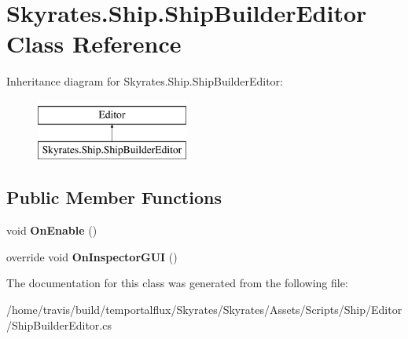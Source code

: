\hypertarget{class_skyrates_1_1_ship_1_1_ship_builder_editor}{\section{Skyrates.\-Ship.\-Ship\-Builder\-Editor Class Reference}
\label{class_skyrates_1_1_ship_1_1_ship_builder_editor}
}
Inheritance diagram for Skyrates.\-Ship.\-Ship\-Builder\-Editor\-:\begin{figure}[H]
\begin{center}
\leavevmode
\includegraphics[height=2.000000cm]{class_skyrates_1_1_ship_1_1_ship_builder_editor}
\end{center}
\end{figure}
\subsection*{Public Member Functions}
\begin{DoxyCompactItemize}
\item 
\hypertarget{class_skyrates_1_1_ship_1_1_ship_builder_editor_ab8e46e939605abf42201912cf163e8f1}{void {\bfseries On\-Enable} ()}\label{class_skyrates_1_1_ship_1_1_ship_builder_editor_ab8e46e939605abf42201912cf163e8f1}

\item 
\hypertarget{class_skyrates_1_1_ship_1_1_ship_builder_editor_abcec5a148c1db668af4af828d777c71f}{override void {\bfseries On\-Inspector\-G\-U\-I} ()}\label{class_skyrates_1_1_ship_1_1_ship_builder_editor_abcec5a148c1db668af4af828d777c71f}

\end{DoxyCompactItemize}


The documentation for this class was generated from the following file\-:\begin{DoxyCompactItemize}
\item 
/home/travis/build/temportalflux/\-Skyrates/\-Skyrates/\-Assets/\-Scripts/\-Ship/\-Editor/Ship\-Builder\-Editor.\-cs\end{DoxyCompactItemize}
